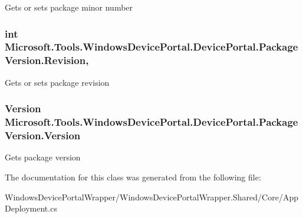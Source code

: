 Gets or sets package minor number 

\subsubsection[{\texorpdfstring{Revision}{Revision}}]{\setlength{\rightskip}{0pt plus 5cm}int Microsoft.\+Tools.\+Windows\+Device\+Portal.\+Device\+Portal.\+Package\+Version.\+Revision\hspace{0.3cm}{\ttfamily [get]}, {\ttfamily [set]}}\hypertarget{class_microsoft_1_1_tools_1_1_windows_device_portal_1_1_device_portal_1_1_package_version_a23d55ab1063eff720be949ee5040d352}{}\label{class_microsoft_1_1_tools_1_1_windows_device_portal_1_1_device_portal_1_1_package_version_a23d55ab1063eff720be949ee5040d352}


Gets or sets package revision 

\subsubsection[{\texorpdfstring{Version}{Version}}]{\setlength{\rightskip}{0pt plus 5cm}Version Microsoft.\+Tools.\+Windows\+Device\+Portal.\+Device\+Portal.\+Package\+Version.\+Version\hspace{0.3cm}{\ttfamily [get]}}\hypertarget{class_microsoft_1_1_tools_1_1_windows_device_portal_1_1_device_portal_1_1_package_version_ae5fd9e76ccbf68c26c8293f48c0a5d36}{}\label{class_microsoft_1_1_tools_1_1_windows_device_portal_1_1_device_portal_1_1_package_version_ae5fd9e76ccbf68c26c8293f48c0a5d36}


Gets package version 



The documentation for this class was generated from the following file\+:\begin{DoxyCompactItemize}
\item 
Windows\+Device\+Portal\+Wrapper/\+Windows\+Device\+Portal\+Wrapper.\+Shared/\+Core/App\+Deployment.\+cs\end{DoxyCompactItemize}

